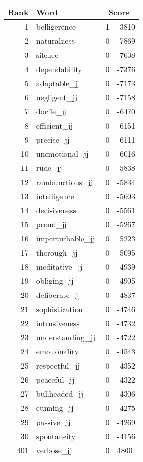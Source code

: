 \begin{longtable}[!htbp]{| rlr@{.}l |}
    \hline
    \textbf{Rank} & \textbf{Word} & \multicolumn{2}{c|}{\textbf{Score}} \\
    \hline
    \endhead
    1 & belligerence & -1 & -3810 \\
    2 & naturalness & 0 & -7869 \\
    3 & silence & 0 & -7638 \\
    4 & dependability & 0 & -7376 \\
    5 & adaptable\_jj & 0 & -7173 \\
    6 & negligent\_jj & 0 & -7158 \\
    7 & docile\_jj & 0 & -6470 \\
    8 & efficient\_jj & 0 & -6151 \\
    9 & precise\_jj & 0 & -6111 \\
    10 & unemotional\_jj & 0 & -6016 \\
    11 & rude\_jj & 0 & -5838 \\
    12 & rambunctious\_jj & 0 & -5834 \\
    13 & intelligence & 0 & -5603 \\
    14 & decisiveness & 0 & -5561 \\
    15 & proud\_jj & 0 & -5267 \\
    16 & imperturbable\_jj & 0 & -5223 \\
    17 & thorough\_jj & 0 & -5095 \\
    18 & meditative\_jj & 0 & -4939 \\
    19 & obliging\_jj & 0 & -4905 \\
    20 & deliberate\_jj & 0 & -4837 \\
    21 & sophistication & 0 & -4746 \\
    22 & intrusiveness & 0 & -4732 \\
    23 & understanding\_jj & 0 & -4722 \\
    24 & emotionality & 0 & -4543 \\
    25 & respectful\_jj & 0 & -4352 \\
    26 & peaceful\_jj & 0 & -4322 \\
    27 & bullheaded\_jj & 0 & -4306 \\
    28 & cunning\_jj & 0 & -4275 \\
    29 & passive\_jj & 0 & -4269 \\
    30 & spontaneity & 0 & -4156 \\
    401 & verbose\_jj & 0 & 4800 \\

\end{longtable}
